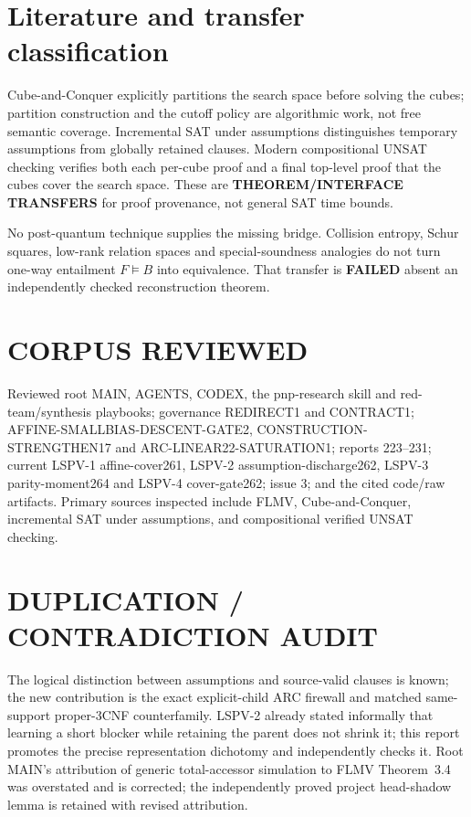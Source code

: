 \documentclass[11pt]{article}
\begin{document}
\section{Literature and transfer classification}
Cube-and-Conquer explicitly partitions the search space before solving the
cubes; partition construction and the cutoff policy are algorithmic work, not
free semantic coverage.  Incremental SAT under assumptions distinguishes
temporary assumptions from globally retained clauses.  Modern compositional
UNSAT checking verifies both each per-cube proof and a final top-level proof
that the cubes cover the search space.  These are \textbf{THEOREM/INTERFACE
TRANSFERS} for proof provenance, not general SAT time bounds.

No post-quantum technique supplies the missing bridge.  Collision entropy,
Schur squares, low-rank relation spaces and special-soundness analogies do not
turn one-way entailment $F\models B$ into equivalence.  That transfer is
\textbf{FAILED} absent an independently checked reconstruction theorem.

\section{CORPUS REVIEWED}
Reviewed root MAIN, AGENTS, CODEX, the pnp-research skill and red-team/synthesis
playbooks; governance REDIRECT1 and CONTRACT1; AFFINE-SMALLBIAS-DESCENT-GATE2,
CONSTRUCTION-STRENGTHEN17 and ARC-LINEAR22-SATURATION1; reports 223--231;
current LSPV-1 affine-cover261, LSPV-2 assumption-discharge262, LSPV-3
parity-moment264 and LSPV-4 cover-gate262; issue 3; and the cited code/raw
artifacts.  Primary sources inspected include FLMV, Cube-and-Conquer,
incremental SAT under assumptions, and compositional verified UNSAT checking.

\section{DUPLICATION / CONTRADICTION AUDIT}
The logical distinction between assumptions and source-valid clauses is known;
the new contribution is the exact explicit-child ARC firewall and matched
same-support proper-3CNF counterfamily.  LSPV-2 already stated informally that
learning a short blocker while retaining the parent does not shrink it; this
report promotes the precise representation dichotomy and independently checks
it.  Root MAIN's attribution of generic total-accessor simulation to FLMV
Theorem~3.4 was overstated and is corrected; the independently proved project
head-shadow lemma is retained with revised attribution.
\end{document}

